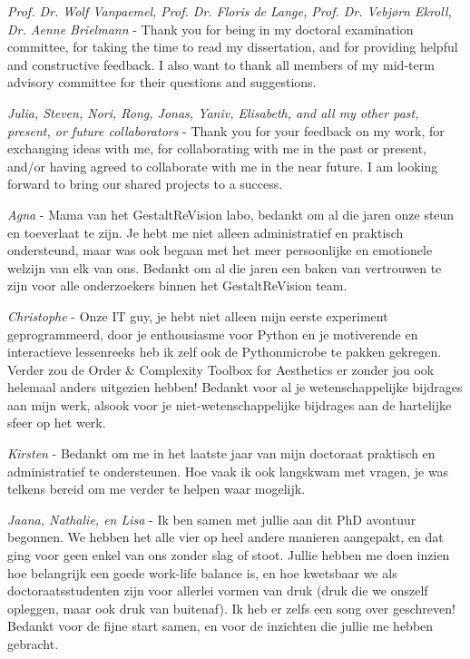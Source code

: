 \textit{Prof. Dr. Wolf Vanpaemel, Prof. Dr. Floris de Lange, Prof. Dr. Vebjørn Ekroll, Dr. Aenne Brielmann} - Thank you for being in my doctoral examination committee, for taking the time to read my dissertation, and for providing helpful and constructive feedback. I also want to thank all members of my mid-term advisory committee for their questions and suggestions. 

\textit{Julia, Steven, Nori, Rong, Jonas, Yaniv, Elisabeth, and all my other past, present, or future collaborators} - Thank you for your feedback on my work, for exchanging ideas with me, for collaborating with me in the past or present, and/or having agreed to collaborate with me in the near future. I am looking forward to bring our shared projects to a success.

\textit{Agna} - Mama van het GestaltReVision labo, bedankt om al die jaren onze steun en toeverlaat te zijn. Je hebt me niet alleen administratief en praktisch ondersteund, maar was ook begaan met het meer persoonlijke en emotionele welzijn van elk van ons. Bedankt om al die jaren een baken van vertrouwen te zijn voor alle onderzoekers binnen het GestaltReVision team.

\textit{Christophe} - Onze IT guy, je hebt niet alleen mijn eerste experiment geprogrammeerd, door je enthousiasme voor Python en je motiverende en interactieve lessenreeks heb ik zelf ook de Pythonmicrobe te pakken gekregen. Verder zou de Order \& Complexity Toolbox for Aesthetics er zonder jou ook helemaal anders uitgezien hebben! Bedankt voor al je wetenschappelijke bijdrages aan mijn werk, alsook voor je niet-wetenschappelijke bijdrages aan de hartelijke sfeer op het werk.

\textit{Kirsten} - Bedankt om me in het laatste jaar van mijn doctoraat praktisch en administratief te ondersteunen. Hoe vaak ik ook langskwam met vragen, je was telkens bereid om me verder te helpen waar mogelijk.

\textit{Jaana, Nathalie, en Lisa} - Ik ben samen met jullie aan dit PhD avontuur begonnen. We hebben het alle vier op heel andere manieren aangepakt, en dat ging voor geen enkel van ons zonder slag of stoot. Jullie hebben me doen inzien hoe belangrijk een goede work-life balance is, en hoe kwetsbaar we als doctoraatsstudenten zijn voor allerlei vormen van druk (druk die we onszelf opleggen, maar ook druk van buitenaf). Ik heb er zelfs een song over geschreven! Bedankt voor de fijne start samen, en voor de inzichten die jullie me hebben gebracht. 

